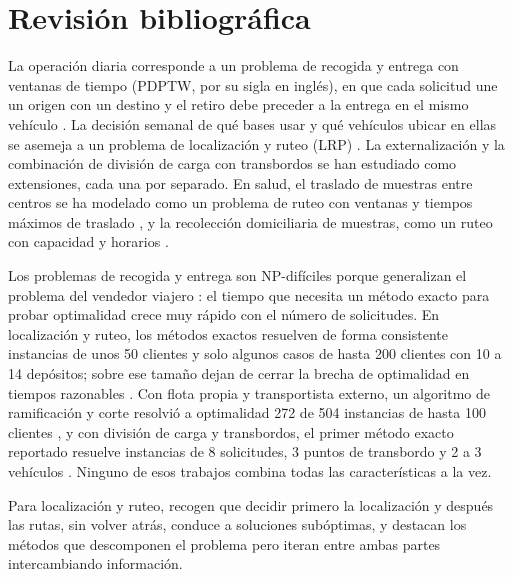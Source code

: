 \section{Revisión bibliográfica}\label{sec:revision}

 La operación diaria corresponde a un problema de recogida y entrega con ventanas de tiempo (PDPTW, por su sigla en inglés), en que cada solicitud une un origen con un destino y el retiro debe preceder a la entrega en el mismo vehículo \cite{parragh_doerner_hartl_2008}. La decisión semanal de qué bases usar y qué vehículos ubicar en ellas se asemeja a un problema de localización y ruteo (LRP) \cite{prodhon_prins_2014}. La externalización \cite{dabia_lai_vigo_2019} y la combinación de división de carga con transbordos \cite{wolfinger_salazar_2021} se han estudiado como extensiones, cada una por separado. En salud, el traslado de muestras entre centros se ha modelado como un problema de ruteo con ventanas y tiempos máximos de traslado \cite{benini_detti_zabalo_2021}, y la recolección domiciliaria de muestras, como un ruteo con capacidad y horarios \cite{ettazi_2021}.

 Los problemas de recogida y entrega son NP-difíciles porque generalizan el problema del vendedor viajero \cite{parragh_doerner_hartl_2008}: el tiempo que necesita un método exacto para probar optimalidad crece muy rápido con el número de solicitudes. En localización y ruteo, los métodos exactos resuelven de forma consistente instancias de unos 50 clientes y solo algunos casos de hasta 200 clientes con 10 a 14 depósitos; sobre ese tamaño dejan de cerrar la brecha de optimalidad en tiempos razonables \cite{prodhon_prins_2014}. Con flota propia y transportista externo, un algoritmo de ramificación y corte resolvió a optimalidad 272 de 504 instancias de hasta 100 clientes \cite{dabia_lai_vigo_2019}, y con división de carga y transbordos, el primer método exacto reportado resuelve instancias de 8 solicitudes, 3 puntos de transbordo y 2 a 3 vehículos \cite{wolfinger_salazar_2021}. Ninguno de esos trabajos combina todas las características a la vez.

 Para localización y ruteo,  recogen que decidir primero la localización y después las rutas, sin volver atrás, conduce a soluciones subóptimas, y destacan los métodos que descomponen el problema pero iteran entre ambas partes intercambiando información.

